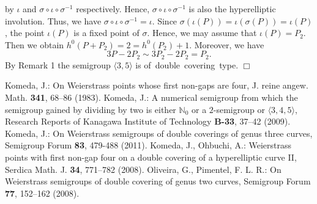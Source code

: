 \documentclass[a4paper,12pt]{article}
\newcommand{\qed}{\hfill $  \Box $}
\newcommand{\la}{\langle}
\newcommand{\ra}{\rangle}
\newcommand{\DC}{\mbox{of double covering type}}
\begin{document}
by $\iota$ and $\sigma\circ\iota\circ\sigma^{-1}$ respectively.
Hence, $\sigma\circ\iota\circ\sigma^{-1}$ is also the hyperelliptic involution.
Thus, we have $\sigma\circ\iota\circ\sigma^{-1}=\iota$.
Since $\sigma(\iota(P))=\iota(\sigma(P))=\iota(P)$, the point $\iota(P)$ is a fixed point of $\sigma$.
Hence, we may assume that $\iota(P)=P_2$.
Then we obtain $h^0(P+P_2)=2=h^0(P_2)+1$.
Moreover, we have
$$3P-2P_2\sim 3P_2-2P_2=P_2.$$
By Remark 1 the semigroup $\la 3,5\ra$ is \DC.
\qed
%
\begin{thebibliography}{00}
%
 Komeda, J.: On Weierstrass points whose first non-gaps are four, J. reine angew. Math. \textbf{341}, 68--86 (1983).
%
 Komeda, J.: A numerical semigroup from which the semigroup gained by dividing by two is
either $\mathbb{N}_0$ or a $2$-semigroup or $\langle 3,4,5\rangle$, Research Reports of Kanagawa Institute of
Technology \textbf{B-33}, 37--42 (2009).
%
 Komeda, J.: On Weierstrass semigroups of double coverings of genus three curves, Semigroup Forum {\bf 83}, 479-488 (2011).
%
%
%
%
 Komeda, J., Ohbuchi, A.: Weierstrass points with first non-gap four on a double covering of a hyperelliptic
curve II, Serdica Math. J. \textbf{34}, 771--782 (2008). 
%
 Oliveira, G., Pimentel, F. L. R.: On Weierstrass semigroups of double covering of genus two curves,
Semigroup Forum \textbf{77}, 152--162  (2008). 
%
%

\end{thebibliography} 
\end{document}
